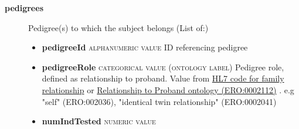 \documentclass[a4paper, 10pt]{article}        %
\begin{document}
\begin{description}

	\item[\textbf{pedigrees}] Pedigree(s) to which the subject belongs (List of:)
	\begin{itemize}
			\item[] \textbf{pedigreeId} {\textsc{alphanumeric value}}  ID referencing pedigree
			\item[] \textbf{pedigreeRole} {\textsc{categorical value (ontology label)}} Pedigree role, defined as relationship to proband. Value from \href{https://www.hl7.org/implement/standards/fhir/2013Sep/familial-relationship.htm}{HL7 code for family relationship} or \href{https://www.ebi.ac.uk/ols/ontologies/ero/terms?iri=http%3A%2F%2Fpurl.obolibrary.org%2Fobo%2FERO_0002112}{Relationship to Proband ontology (ERO:0002112)} . e.g "self" (ERO:002036), "identical twin relationship" (ERO:0002041)
			\item[] \textbf{numIndTested} {\textsc{numeric value}}
	\end{itemize}


 \end{description}
\end{document}
